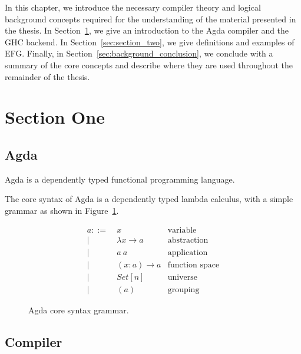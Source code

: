 

In this chapter, we introduce the necessary compiler theory and logical background concepts required for the understanding of the material presented in the thesis. In Section~\ref{sec:section_one}, we give an introduction to the Agda compiler and the GHC backend. In Section~\ref{sec:section_two}, we give definitions and examples of EFG. Finally, in Section~\ref{sec:background_conclusion}, we conclude with a summary of the core concepts and describe where they are used throughout the remainder of the thesis.

\section{Section One}
\label{sec:section_one}

\subsection{Agda}

Agda is a dependently typed functional programming language.



The core syntax of Agda is a dependently typed lambda calculus, with a simple grammar as shown in Figure~\ref{fig:grammar}.

\begin{figure}
\begin{align*}
a ::=~& x               & \text{variable}\\
    |~& \lambda x \to a & \text{abstraction}\\
    |~& a~a             & \text{application}\\
    |~& (x : a) \to a   & \text{function space}\\
    |~& Set[n]          & \text{universe}\\
    |~& (a)             & \text{grouping}
\end{align*}
\caption{Agda core syntax grammar.\cite{agdawiki}}
\label{fig:grammar}
\end{figure}

\subsection{Compiler}

